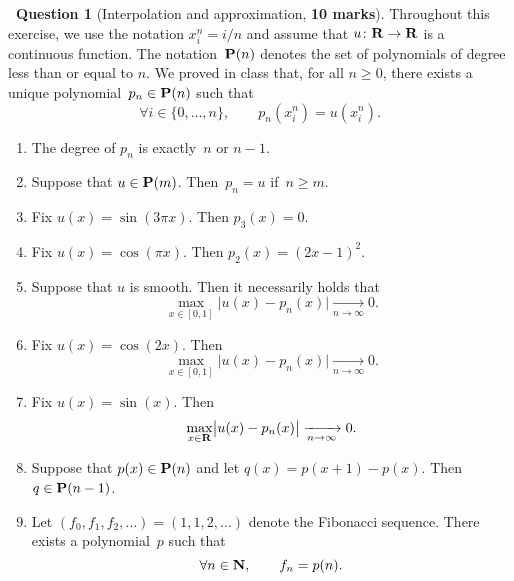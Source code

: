 \documentclass[11pt]{article}
\theoremstyle{definition}
\newtheorem{question}{{\normalfont \faGears}~Question}
\renewcommand{\mymarks}[1]{\textbf{#1 marks}}
\begin{document}
\newpage
\begin{question}
    [Interpolation and approximation, \mymarks{10}]
    Throughout this exercise, we use the notation
    $x^n_i = i/n$ and assume that $u \colon \mathbf R \to \mathbf R$ is a continuous function.
    The notation~$\mathbf P(n)$ denotes the set of polynomials of degree less than or equal to $n$.
    We proved in class that,
    for all $n \geq 0$,
    there exists a unique polynomial~$p_n \in \mathbf P(n)$ such that
    \begin{equation}
        \label{eq:interpolation}
        \forall i \in \{0, \dotsc, n\}, \qquad
        p_n(x^n_i) = u (x^n_i).
    \end{equation}
    \begin{enumerate}
        \item
            The degree of $p_n$ is exactly~$n$ or $n - 1$.

        \item
            Suppose that $u \in \mathbf P(m)$.
            Then~$p_n = u$ if~$n \geq m$.

        \item
            Fix $u(x) = \sin(3\pi x)$. Then $p_3(x) = 0$.

        \item
            Fix $u(x) = \cos(\pi x)$.
            Then $p_2(x) = (2x - 1)^2$.

        \item
            Suppose that $u$ is smooth.
            Then it necessarily holds that
            \[
                \max_{x \in [0, 1]} \bigl\lvert u(x) - p_n(x) \bigr\rvert \xrightarrow[n \to \infty]{} 0.
            \]

        \item
            Fix $u(x) = \cos(2x)$.
            Then
            \[
                \max_{x \in [0, 1]} \bigl\lvert u(x) - p_n(x) \bigr\rvert \xrightarrow[n \to \infty]{} 0.
            \]

        \item
            Fix $u(x) = \sin(x)$.
            Then
            \[
                \max_{x \in \mathbf R} \bigl\lvert u(x) - p_n(x) \bigr\rvert \xrightarrow[n \to \infty]{} 0.
            \]

        \item
            Suppose that $p(x) \in \mathbf P(n)$ and let $q(x) = p(x+1) - p(x)$. Then $q \in \mathbf P(n-1)$.

        \item
            Let $(f_0, f_1, f_2, \dotsc) = (1, 1, 2, \dotsc)$ denote the Fibonacci sequence.
            There exists a polynomial~$p$ such that
            \begin{equation*}
                \label{eq:fibonacci_polynomial}
                \forall n \in \mathbf N, \qquad
                f_n = p(n).
            \end{equation*}


\end{enumerate}
\end{question}
\end{document}

